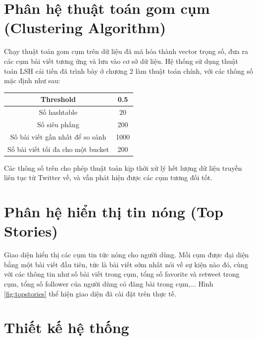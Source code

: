 \section{Phân hệ thuật toán gom cụm (Clustering Algorithm)}
Chạy thuật toán gom cụm trên dữ liệu đã mã hóa thành vector trọng số, đưa ra các cụm bài viết tương ứng và lưu vào cơ sở dữ liệu. Hệ thống sử dụng thuật toán LSH cải tiến đã trình bày ở chương 2 làm thuật toán chính, với các thông số mặc định như sau:
	\begin{table}[H]
		\centering
		\setlength\extrarowheight{3pt}
		\begin{tabular}{|c|c|}
			\hline 
			Threshold & 0.5 \\ 
			\hline 
			Số hashtable & 20 \\ 
			\hline 
			Số siêu phẳng & 200 \\ 
			\hline 
			Số bài viết gần nhất để so sánh & 1000 \\ 
			\hline 
			Số bài viết tối đa cho một bucket & 200 \\ 
			\hline 
		\end{tabular} 
	\end{table}

Các thông số trên cho phép thuật toán kịp thời xử lý hết lượng dữ liệu truyền liên tục từ Twitter về, và vẫn phát hiện được các cụm tương đối tốt.

\section{Phân hệ hiển thị tin nóng (Top Stories)}
Giao diện hiển thị các cụm tin tức nóng cho người dùng. Mỗi cụm được đại diện bằng một bài viết đầu tiên, tức là bài viết sớm nhất nói về sự kiện nào đó, cùng với các thông tin như số bài viết trong cụm, tổng số favorite và retweet trong cụm, tổng số follower của người dùng có đăng bài trong cụm,... Hình \ref{fig:topstories} thể hiện giao diện đã cài đặt trên thực tế.

\section{Thiết kế hệ thống} 


